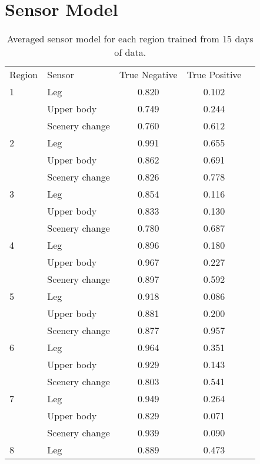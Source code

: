 
\appendix

\label{sec:supplementary}
\section{Sensor Model}

\begin{table}[ht]
	\centering
	\caption{Averaged sensor model for each region trained from 15 days of data.}
	\label{table:full_region_sensor_model}
	\begin{tabular}{llccc}
		\noalign{\hrule height 1.1pt}\noalign{\smallskip}
		Region & Sensor & True Negative & True Positive \\
		\noalign{\smallskip}\hline\noalign{\smallskip}
		1   & Leg               & 0.820 & 0.102 \\
		& Upper body        & 0.749 & 0.244 \\
		& Scenery change    & 0.760 & 0.612 \\ 
		2   & Leg               & 0.991 & 0.655 \\
		& Upper body        & 0.862 & 0.691 \\
		& Scenery change    & 0.826 & 0.778 \\
		3   & Leg               & 0.854 & 0.116 \\
		& Upper body        & 0.833 & 0.130 \\
		& Scenery change    & 0.780 & 0.687 \\
		4   & Leg               & 0.896 & 0.180 \\
		& Upper body        & 0.967 & 0.227 \\
		& Scenery change    & 0.897 & 0.592 \\
		5   & Leg               & 0.918 & 0.086 \\
		& Upper body        & 0.881 & 0.200 \\
		& Scenery change    & 0.877 & 0.957 \\
		6   & Leg               & 0.964 & 0.351 \\
		& Upper body        & 0.929 & 0.143 \\
		& Scenery change    & 0.803 & 0.541 \\
		7   & Leg               & 0.949 & 0.264 \\
		& Upper body        & 0.829 & 0.071 \\
		& Scenery change    & 0.939 & 0.090 \\
		8   & Leg               & 0.889 & 0.473 \\

\end{tabular}
\end{table}
